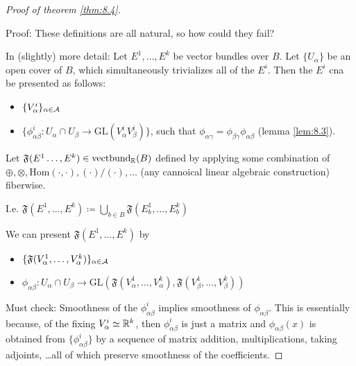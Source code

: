 \begin{proof}[Proof of theorem \ref{thm:8.4}]
    \phantom{Test}

    \begin{displayquote}
        Proof: These definitions are all natural, so how could they fail?
    \end{displayquote}

    In (slightly) more detail: Let \(E^1,\dots,E^k\) be vector bundles over \(B\).
    Let \(\{U_\alpha\}\) be an open cover of \(B\), which simultaneously trivializes all of the \(E^i\).
    Then the \(E^i\) cna be presented as follows: 
    \begin{itemize}
        \item \(\{V_\alpha^i\}_{\alpha\in\mathcal{A}}\)
        \item \(\{\phi_{\alpha\beta}^i:U_\alpha\cap U_\beta\to \text{GL}(V_\alpha^iV_\beta^i)\}\), such that \(\phi_{\alpha\gamma}=\phi_{\beta\gamma}\phi_{\alpha\beta}\) (lemma \ref{lem:8.3}).
    \end{itemize} 
    Let \(\mathfrak{F}(E^1\dots,E^k)\in\text{vectbund}_{\mathbb{R}}(B)\) defined by applying some combination of 
    \(\oplus,\otimes,\text{Hom}(\cdot,\cdot),(\cdot)/(\cdot),\dots\) (any cannoical linear algebraic construction) fiberwise.

    I.e. \(\mathfrak{F}(E^1,\dots,E^k)\coloneqq \bigcup_{b\in B}\mathfrak{F}(E_b^1,\dots,E_b^k)\)

    We can present \(\mathfrak{F}(E^1,\dots,E^k)\) by 
    \begin{itemize}
        \item \(\{\mathfrak{F}(V_\alpha^1,\dots,V_\alpha^k)\}_{\alpha\in \mathcal{A}}\)
        \item \(\phi_{\alpha\beta}:U_\alpha\cap U_\beta \to \text{GL}(\mathfrak{F}(V_\alpha^1,\dots,V_\alpha^k),\mathfrak{F}(V_\beta^1,\dots,V_\beta^k))\)
    \end{itemize}

    Must check: Smoothness of the \(\phi_{\alpha\beta}^i\) implies smoothness of \(\phi_{\alpha\beta}\). This 
    is essentially because, of the  fixing \(V_\alpha^i\simeq \mathbb{R}^k\), then \(\phi_{\alpha\beta}^i\) is just 
    a matrix and \(\phi_{\alpha\beta}(x)\) is obtained from \(\{\phi_{\alpha\beta}^i\}\) by a sequence of matrix addition, multiplications,
    taking adjoints, \dots all of which preserve smoothness of the coefficients. \qedhere

\end{proof}


